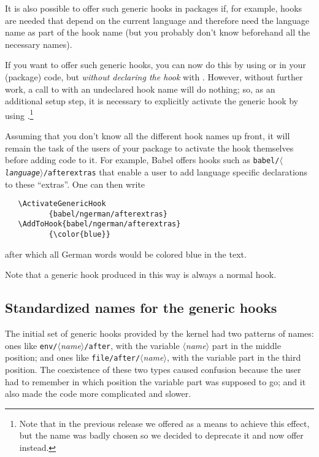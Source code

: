 \documentclass{ltnews}
\providecommand\hook[1]{\texttt{#1}}
\providecommand\meta[1]{$\langle$\textrm{\itshape#1}$\rangle$}
\begin{document}
It is also possible to offer such generic hooks in 
packages if, for example, hooks are needed that depend on the 
current language and therefore need the
language name as part of the hook name (but you probably 
don't know beforehand all the necessary names).

If you want to offer such generic hooks, you can now 
do this by using
 or  in your (package) code, but
\emph{without declaring the hook} with . However, without 
further work, a call to  with an undeclared hook name 
will do 
nothing; so, as an additional setup step, it is necessary to explicitly
activate the generic hook by using .\footnote{Note
  that in the previous release we offered  as a means
  to achieve this effect, but the name was badly chosen so we decided
  to deprecate it and now offer  instead.}

Assuming
that you don't know all the different hook names up front, it will
remain the task of the users of your package to activate the hook
themselves before adding code to it. For example, Babel offers hooks
such as \hook{babel/\meta{language}/afterextras} 
that enable a user
to add language specific declarations to these \enquote{extras}.  One can then write
\begin{verbatim}
   \ActivateGenericHook
          {babel/ngerman/afterextras}
   \AddToHook{babel/ngerman/afterextras}
          {\color{blue}}
\end{verbatim}
after which all German words would be colored blue in the text.

Note that a generic hook produced in this way is always a normal hook.

\subsection{Standardized names for the generic hooks}

The initial set of generic hooks provided by the kernel had
two patterns of names:
ones like
\verb|env/|\meta{name}\verb|/after|, 
with the variable \meta{name}
part in the middle position;
and ones like
\verb|file/after/|\meta{name}, with the 
variable part in the third
position.  
%
The coexistence of these two types caused confusion because
the user had to remember in which position the variable part was
supposed to go; and it also made the code more complicated and slower.
\end{document}
